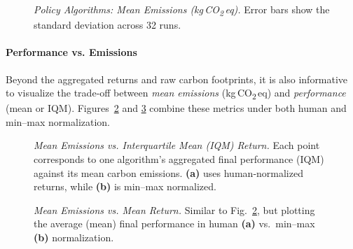 \begin{figure} 
	\centering
	
	\caption{\emph{Policy Algorithms: Mean Emissions (kg\,CO\textsubscript{2}\,eq).} Error bars show the standard deviation across 32 runs.}
	\label{fig:policy_emissions_bar}
\end{figure}

\paragraph{Performance vs. Emissions}
Beyond the aggregated returns and raw carbon footprints, it is also informative to visualize the trade‐off between \emph{mean emissions} (kg\,CO\textsubscript{2}\,eq) and \emph{performance} (mean or IQM). Figures~\ref{fig:scatter_emissions_a} and \ref{fig:scatter_emissions_b} combine these metrics under both human and min–max normalization.

\begin{figure} 
	\centering
	\quad
	\caption{\emph{Mean Emissions vs. Interquartile Mean (IQM) Return.}
		Each point corresponds to one algorithm's aggregated final performance (IQM) against its mean carbon emissions. 
		\textbf{(a)} uses human‐normalized returns, while \textbf{(b)} is min--max normalized.}
	\label{fig:scatter_emissions_a}
\end{figure}

\begin{figure} 
	\centering
	\quad
	\caption{\emph{Mean Emissions vs. Mean Return.}
		Similar to Fig.~\ref{fig:scatter_emissions_a}, but plotting the average (mean) final performance in human \textbf{(a)} vs.\ min--max \textbf{(b)} normalization.}
	\label{fig:scatter_emissions_b}
\end{figure}

